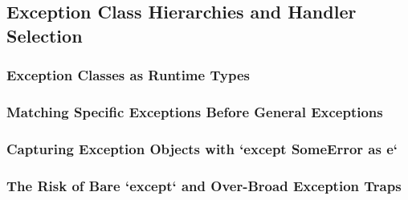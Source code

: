 \subsection{Exception Class Hierarchies and Handler Selection}
\subsubsection{Exception Classes as Runtime Types}
\subsubsection{Matching Specific Exceptions Before General Exceptions}
\subsubsection{Capturing Exception Objects with `except SomeError as e`}
\subsubsection{The Risk of Bare `except` and Over-Broad Exception Traps}
